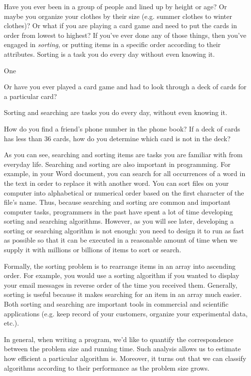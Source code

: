 Have you ever been in a group of people and lined up by height or age? Or maybe you organize your clothes by their size (e.g. summer clothes to winter clothes)? Or what if you are playing a card game and need to put the cards in order from lowest to highest? If you've ever done any of those things, then you've engaged in \emph{sorting}, or putting items in a specific order according to their attributes. Sorting is a task you do every day without even knowing it. 

One


Or have you ever played a card game and had to look through a deck of cards for a particular card? 

Sorting and searching are tasks you do every day, without even knowing it.

How do you find a friend's phone number in the phone book? If a deck of cards has less than 36 cards, how do you determine which card is not in the deck?

As you can see, searching and sorting items are tasks you are familiar with from everyday life. Searching and sorting are also important in programming. For example, in your Word document, you can search for all occurrences of a word in the text in order to replace it with another word. You can sort files on your computer into alphabetical or numerical order based on the first character of the file's name. Thus, because searching and sorting are common and important computer tasks, programmers in the past have spent a lot of time developing sorting and searching algorithms. However, as you will see later, developing a sorting or searching algorithm is not enough: you need to design it to run as fast as possible so that it can be executed in a reasonable amount of time when we supply it with millions or billions of items to sort or search.


 
 Formally, the sorting problem is to rearrange items in an array into ascending order. For example, you would use a sorting algorithm if you wanted to display your email messages in reverse order of the time you received them. Generally, sorting is useful because it makes searching for an item in an array much easier. Both sorting and searching are important tools in commercial and scientific applications (e.g. keep record of your customers, organize your experimental data, etc.).

In general, when writing a program, we’d like to quantify the correspondence between the problem size and running time. Such analysis allows us to estimate how efficient a particular algorithm is. Moreover, it turns out that we can classify algorithms according to their performance as the problem size grows.

